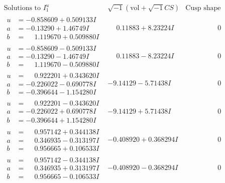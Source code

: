 \documentclass[1p]{elsarticle_modified}
\theoremstyle{definition}
\newcommand{\I}{\sqrt{-1}}
\begin{document}
$$\begin{array}{c|c|c}  
\text{Solutions to }I^u_{1}& \I (\text{vol} + \sqrt{-1}CS) & \text{Cusp shape}\\
 \hline 
\begin{aligned}
u &= -0.858609 + 0.509133 I \\
a &= -0.13290 + 1.46749 I \\
b &= \phantom{-}1.119670 + 0.509880 I\end{aligned}
 & \phantom{-}0.11883 + 8.23224 I & \phantom{-0.000000 } 0 \\ \hline\begin{aligned}
u &= -0.858609 - 0.509133 I \\
a &= -0.13290 - 1.46749 I \\
b &= \phantom{-}1.119670 - 0.509880 I\end{aligned}
 & \phantom{-}0.11883 - 8.23224 I & \phantom{-0.000000 } 0 \\ \hline\begin{aligned}
u &= \phantom{-}0.922201 + 0.343620 I \\
a &= -0.226022 - 0.690778 I \\
b &= -0.396644 - 1.154280 I\end{aligned}
 & -9.14129 - 5.71438 I & \phantom{-0.000000 } 0 \\ \hline\begin{aligned}
u &= \phantom{-}0.922201 - 0.343620 I \\
a &= -0.226022 + 0.690778 I \\
b &= -0.396644 + 1.154280 I\end{aligned}
 & -9.14129 + 5.71438 I & \phantom{-0.000000 } 0 \\ \hline\begin{aligned}
u &= \phantom{-}0.957142 + 0.344138 I \\
a &= \phantom{-}0.346935 - 0.313197 I \\
b &= \phantom{-}0.956665 + 0.106533 I\end{aligned}
 & -0.408920 + 0.368294 I & \phantom{-0.000000 } 0 \\ \hline\begin{aligned}
u &= \phantom{-}0.957142 - 0.344138 I \\
a &= \phantom{-}0.346935 + 0.313197 I \\
b &= \phantom{-}0.956665 - 0.106533 I\end{aligned}
 & -0.408920 - 0.368294 I & \phantom{-0.000000 } 0 \\ \hline\begin{aligned}

\end{aligned}
\end{array}$$
\end{document}
